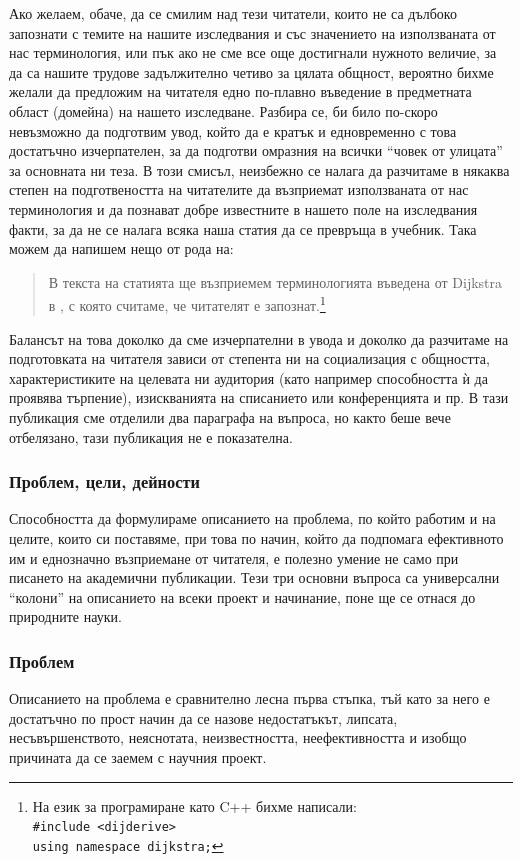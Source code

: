 \documentclass[11pt, oneside]{article}     %
\begin{document}
Ако желаем, обаче, да се смилим над тези читатели, които не са дълбоко запознати с темите на нашите изследвания и със значението на използваната от нас терминология, или пък ако не сме все още достигнали нужното величие, за да са нашите трудове задължително четиво за цялата общност, вероятно бихме желали да предложим на читателя едно по-плавно въведение в предметната област (домейна) на нашето изследване. Разбира се, би било по-скоро невъзможно да подготвим увод, който да е кратък и едновременно с това достатъчно изчерпателен, за да подготви омразния на всички ``човек от улицата'' за основната ни теза. В този смисъл, неизбежно се налага да разчитаме в някаква степен на подготвеността на читателите да възприемат използваната от нас терминология и да познават добре известните в нашето поле на изследвания факти, за да не се налага всяка наша статия да се превръща в учебник. Така можем да напишем нещо от рода на:

\begin{quote}
  В текста на статията ще възприемем терминологията въведена от Dijkstra в \cite{dijderive}, с която считаме, че читателят е запознат.\footnote{На език за програмиране като C++ бихме написали:\\
\texttt{\#include <dijderive>}\\
\texttt{using namespace dijkstra;}}
\end{quote}

Балансът на това доколко да сме изчерпателни в увода и доколко да разчитаме на подготовката на читателя зависи от степента ни на социализация с общността, характеристиките на целевата ни аудитория (като например способността ѝ да проявява търпение), изискванията на списанието или конференцията и пр. В тази публикация сме отделили два параграфа на въпроса, но както беше вече отбелязано, тази публикация не е показателна.

\subsubsection*{Проблем, цели, дейности}

Способността да формулираме описанието на проблема, по който работим и на целите, които си поставяме, при това по начин, който да подпомага ефективното им и еднозначно възприемане от читателя, е полезно умение не само при писането на академични публикации. Тези три основни въпроса са универсални ``колони'' на описанието на всеки проект и начинание, поне ще се отнася до природните науки.

\subsubsection*{Проблем}
Описанието на проблема е сравнително лесна първа стъпка, тъй като за него е достатъчно по прост начин да се назове недостатъкът, липсата, несъвършенството, неяснотата, неизвестността, неефективността и изобщо причината да се заемем с научния проект.
\end{document}
